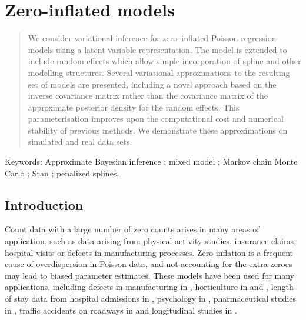 \chapter{Zero-inflated models}

\begin{abstract}
	\noindent We consider variational inference for zero--inflated Poisson regression models using a latent
	variable representation. The model is extended to include random effects which allow simple incorporation of
	spline and other modelling structures. Several variational approximations to the resulting set of models are
	presented, including a novel approach based on the inverse covariance matrix rather than the covariance matrix
	of the approximate posterior density for the random effects. This parameterisation improves upon the
	computational cost and numerical stability of previous methods. We demonstrate these approximations on
	simulated and real data sets.
\end{abstract}
 
\noindent Keywords: Approximate Bayesian inference ; mixed model ; Markov chain Monte Carlo ; Stan ; penalized splines.


\section{Introduction}
\label{sec:introduction}


Count data with a large number of zero counts arises in many areas of application, such as data arising from
physical activity studies, insurance claims, hospital visits or defects in manufacturing processes. Zero
inflation is a frequent cause of overdispersion in Poisson data, and not accounting for the extra zeroes may
lead to biased parameter estimates. These models have been used for many applications, including defects in
manufacturing in \citep{lambert1992}, horticulture in \citep{BIOM:BIOM1030} and \citep{BIOM:BIOM1030}, length
of stay data from hospital admissions in \citep{BIMJ:BIMJ200390024}, psychology in \citep{JOFP:rethink},
pharmaceutical studies in \citep{Min01042005}, traffic accidents on roadways in \citep{Shankar1997829} and
longitudinal studies in \citep{LeeWangScottYauMcLachlan2006}.

